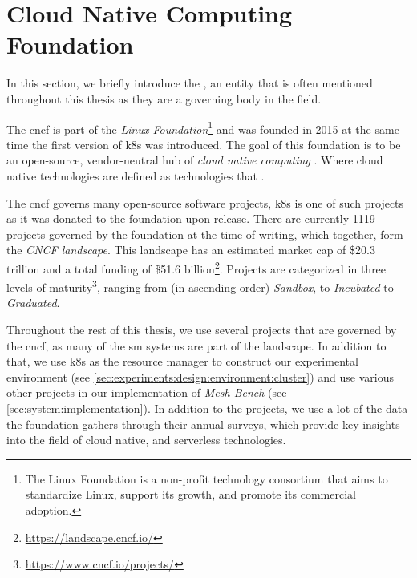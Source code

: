\section{Cloud Native Computing Foundation}
\label{sec:background:cncf}


In this section, we briefly introduce the , an entity that is often mentioned throughout this thesis as they are a governing body in the field. 

The \gls{cncf} is part of the \textit{Linux Foundation}\footnote{The Linux Foundation  is a non-profit technology consortium that aims to standardize Linux, support its growth, and promote its commercial adoption.} and was founded in 2015 at the same time the first version of \gls{k8s} was introduced. The goal of this foundation is to be an open-source, vendor-neutral hub of \textit{cloud native computing} \cite{cncf-charter}. Where cloud native technologies are defined as technologies that .

The \gls{cncf} governs many open-source software projects, \gls{k8s} is one of such projects as it was donated to the foundation upon release. There are currently 1119 projects governed by the foundation at the time of writing, which together, form the \textit{CNCF landscape}. This landscape has an estimated market cap of \$20.3 trillion and a total funding of \$51.6 billion\footnote{\url{https://landscape.cncf.io/}}. Projects are categorized in three levels of maturity\footnote{\url{https://www.cncf.io/projects/}}, ranging from (in ascending order) \textit{Sandbox}, to \textit{Incubated} to \textit{Graduated}.

Throughout the rest of this thesis, we use several projects that are governed by the \gls{cncf}, as many of the \gls{sm} systems are part of the landscape. In addition to that, we use \gls{k8s} as the resource manager to construct our experimental environment (see \cref{sec:experiments:design:environment:cluster}) and use various other projects in our implementation of \textit{Mesh Bench} (see \cref{sec:system:implementation}). In addition to the projects, we use a lot of the data the foundation gathers through their annual surveys, which provide key insights into the field of cloud native, and serverless technologies.
 